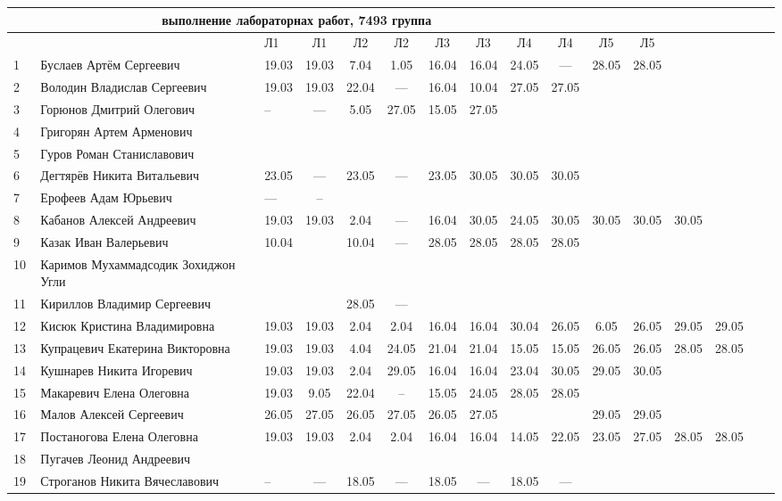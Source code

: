 \documentclass[a4paper,11pt]{article}
\begin{document}
%
\hspace{-6.1cm} %
\begin{tabular}{l|llccccccccccccc}
\multicolumn{10}{c}{выполнение лабораторнах работ, 7493 группа} \\
\toprule
&&Л1&Л1& Л2&Л2& Л3&Л3& Л4&Л4& Л5&Л5\\ 
\midrule
1\,&Буслаев Артём Сергеевич               &19.03&19.03& 7.04& 1.05&16.04&16.04&24.05& --- &28.05&28.05\\
2\,&Володин Владислав Сергеевич           &19.03&19.03&22.04& --- &16.04&10.04&27.05&27.05\\
3\,&Горюнов Дмитрий Олегович              &--   &---  & 5.05&27.05&15.05&27.05&&\\
4\,&Григорян Артем Арменович              &&&&&&&&\\
5\,&Гуров Роман Станиславович             &&&&&&&&\\
\midrule
6\,&Дегтярёв Никита Витальевич            &23.05& --- &23.05& --- &23.05&30.05&30.05&30.05\\
7\,&Ерофеев Адам Юрьевич                  &---&--&&&&&&\\
	8\,&Кабанов Алексей Андреевич             &19.03&19.03&2.04& --- &16.04&30.05&24.05&30.05&30.05&30.05&30.05\\
9\,&Казак Иван Валерьевич                 &10.04&     &10.04 & ---&28.05&28.05&28.05&28.05\\
10\,&Каримов Мухаммадсодик Зохиджон Угли  &&&&&&&&\\
\midrule
11\,&Кириллов Владимир Сергеевич          &     &     &28.05& ---&&&&\\
12\,&Кисюк Кристина Владимировна          &19.03&19.03&2.04 &2.04&16.04&16.04 &30.04&26.05&6.05&26.05&29.05&29.05\\
13\,&Купрацевич Екатерина Викторовна      &19.03&19.03& 4.04&24.05&21.04&21.04&15.05&15.05&26.05&26.05&28.05&28.05\\
14\,&Кушнарев Никита Игоревич             &19.03&19.03& 2.04&29.05&16.04&16.04&23.04&30.05&29.05&30.05\\
15\,&Макаревич Елена Олеговна             &19.03& 9.05&22.04& --  &15.05&24.05&28.05&28.05\\
\midrule
16\,&Малов Алексей Сергеевич              &26.05&27.05&26.05&27.05&26.05&27.05&&&29.05&29.05\\
17\,&Постаногова Елена Олеговна           &19.03&19.03&2.04&2.04&16.04&16.04&14.05&22.05&23.05&27.05&28.05&28.05\\
18\,&Пугачев Леонид Андреевич             &&&&&&&&\\
19\,&Строганов Никита Вячеславович        &--&---&18.05& --- &18.05& --- &18.05& ---\\

\bottomrule
\end{tabular}
\end{document}

